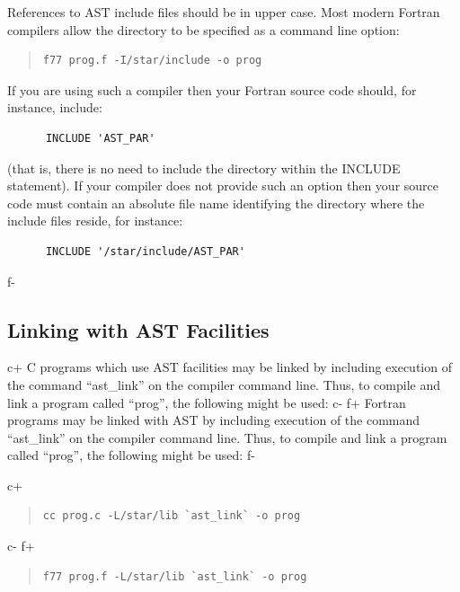 \documentclass[twoside,11pt]{article}
\begin{document}
References to AST include files should be in upper case. Most modern
Fortran compilers allow the directory to be specified as a command line
option:

\begin{quote}
\small
\begin{verbatim}
f77 prog.f -I/star/include -o prog
\end{verbatim}
\normalsize
\end{quote}

If you are using such a compiler then your Fortran source code should,
for instance, include:

\small
\begin{verbatim}
      INCLUDE 'AST_PAR'
\end{verbatim}
\normalsize

(that is, there is no need to include the directory within the INCLUDE
statement). If your compiler does not provide such an option then your
source code must contain an absolute file name identifying the directory 
where the include files reside, for instance:

\small
\begin{verbatim}
      INCLUDE '/star/include/AST_PAR'
\end{verbatim}
\normalsize

f-

\subsection{\label{ss:linking}Linking with AST Facilities}

c+
C programs which use AST facilities may be linked by including
execution of the command ``ast\_link'' on the compiler command
line. Thus, to compile and link a program called ``prog'', the
following might be used:
c-
f+
Fortran programs may be linked with AST by including execution of the
command ``ast\_link'' on the compiler command line. Thus, to compile
and link a program called ``prog'', the following might be used:
f-

c+
\begin{quote}
\small
\begin{verbatim}
cc prog.c -L/star/lib `ast_link` -o prog
\end{verbatim}
\normalsize
\end{quote}
c-
f+
\begin{quote}
\small
\begin{verbatim}
f77 prog.f -L/star/lib `ast_link` -o prog
\end{verbatim}
\normalsize
\end{quote}
\end{document}
